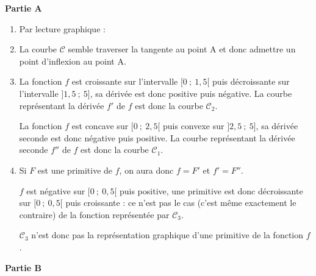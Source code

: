 
\medskip

\textbf{Partie A}


\begin{enumerate}
	\item  Par lecture graphique :

	\begin{center}
	\end{center}



	\item La courbe $\mathcal{C}$  semble traverser la tangente au point A et donc  admettre un point d'inflexion au point A.

	\item La fonction $f$ est croissante sur l'intervalle $[0~;~1,5[$ puis décroissante sur l'intervalle $]1,5~;~5]$, sa dérivée est donc positive puis négative. La courbe représentant la dérivée $f'$ de $f$ est donc la courbe $\mathcal{C}_2$.

	La fonction $f$ est concave sur $[0~;~2,5[$ puis convexe sur $]2,5~;~5]$, sa dérivée seconde est donc négative puis positive. La courbe représentant la dérivée seconde $f''$ de $f$ est donc la courbe $\mathcal{C}_1$.

	\item Si $F$  est une primitive de $f$, on aura donc $f = F'$ et $f'= F''$.

$f$ est négative sur $[0~;~0,5[$ puis positive, une primitive est donc décroissante sur $[0~;~0,5[$ puis croissante : ce n'est pas le cas (c'est même exactement le contraire) de la fonction représentée par $\mathcal{C}_3$.

$\mathcal{C}_3$ n'est donc pas la représentation graphique d'une primitive de la fonction $f$.

%
\end{enumerate}

\textbf{Partie B}


